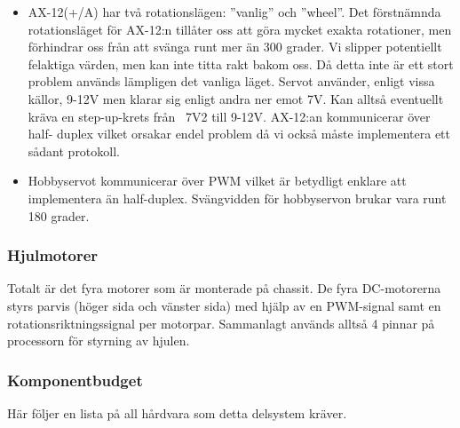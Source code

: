 \documentclass[a4paper,11pt]{article}
\begin{document}
\begin{itemize}
\item AX-12(+/A) har två rotationslägen: ''vanlig'' och ''wheel''. Det förstnämnda rotationsläget för AX-12:n tillåter oss att göra mycket exakta rotationer, men förhindrar oss från att svänga runt mer än 300 grader. Vi slipper potentiellt felaktiga värden, men kan inte titta rakt bakom oss. Då detta inte är ett stort problem används lämpligen det vanliga läget. Servot använder, enligt vissa källor, 9-12V men klarar sig enligt andra ner emot 7V. Kan alltså eventuellt kräva en step-up-krets från ~7V2 till 9-12V. AX-12:an kommunicerar över half- duplex vilket orsakar endel problem då vi också måste implementera ett sådant protokoll.

\item Hobbyservot kommunicerar över PWM vilket är betydligt enklare att implementera än half-duplex. Svängvidden för hobbyservon brukar vara runt 180 grader.
\end{itemize}

\subsubsection{Hjulmotorer}
Totalt är det fyra motorer som är monterade på chassit. De fyra DC-motorerna styrs parvis (höger sida och vänster sida) med hjälp av en PWM-signal samt en rotationsriktningssignal per motorpar. Sammanlagt används alltså 4 pinnar på processorn för styrning av hjulen.

\subsubsection{Komponentbudget}
Här följer en lista på all hårdvara som detta delsystem kräver.

\begin{HardwareList}
\end{HardwareList}
\end{document}
